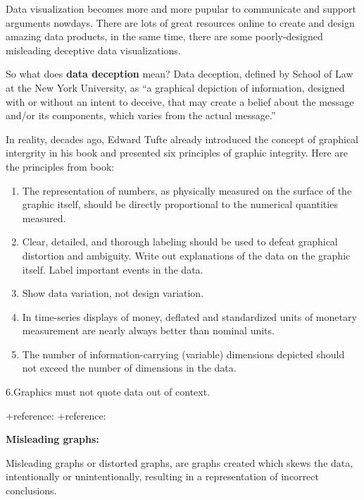 \documentclass[]{book}
\theoremstyle{definition}
\theoremstyle{definition}
\theoremstyle{definition}
\theoremstyle{remark}
\begin{document}
Data visualization becomes more and more pupular to communicate and
support arguments nowdays. There are lots of great resources online to
create and design amazing data products, in the same time, there are
some poorly-designed misleading deceptive data visualizations.

So what does \textbf{data deception} mean? Data deception, defined by
School of Law at the New York University, as ``a graphical depiction of
information, designed with or without an intent to deceive, that may
create a belief about the message and/or its components, which varies
from the actual message.''

In reality, decades ago, Edward Tufte already introduced the concept of
graphical intergrity in his book and presented six principles of graphic
integrity. Here are the principles from book:

\begin{enumerate}
\def\labelenumi{\arabic{enumi}.}
\item
  The representation of numbers, as physically measured on the surface
  of the graphic itself, should be directly proportional to the
  numerical quantities measured.
\item
  Clear, detailed, and thorough labeling should be used to defeat
  graphical distortion and ambiguity. Write out explanations of the data
  on the graphic itself. Label important events in the data.
\item
  Show data variation, not design variation.
\item
  In time-series displays of money, deﬂated and standardized units of
  monetary measurement are nearly always better than nominal units.
\item
  The number of information-carrying (variable) dimensions depicted
  should not exceed the number of dimensions in the data.
\end{enumerate}

6.Graphics must not quote data out of context.

+reference: \citep{visual_deception} +reference: \citep{visual_display}

\textbf{Misleading graphs:}

Misleading graphs or distorted graphs, are graphs created which skews
the data, intentionally or unintentionally, resulting in a
representation of incorrect conclusions.
\end{document}
